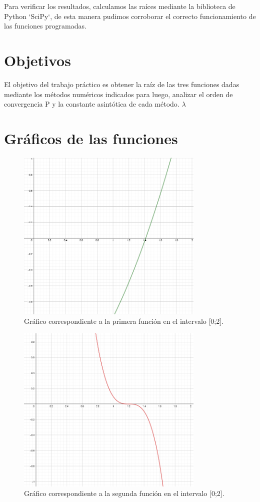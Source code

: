 \documentclass[titlepage,a4paper]{article}
\begin{document}
Para verificar los resultados, calculamos las raíces mediante la biblioteca de Python `SciPy`, de esta manera pudimos corroborar el correcto funcionamiento de las funciones programadas.

\section{Objetivos}\label{sec:objetivos}
El objetivo del trabajo práctico es obtener la raíz de las tres funciones dadas mediante los métodos numéricos indicados para luego, analizar el orden de convergencia P y la constante asintótica de cada método. $\lambda$


\section{Gráficos de las funciones}\label{sec:graficosfun}

\begin{figure}[H]
\centering
\includegraphics[width=0.8\textwidth]{funcion1.png}
\caption{\label{fig:class01}Gráfico correspondiente a la primera función en el intervalo [0;2].}
\end{figure}

\begin{figure}[H]
\centering
\includegraphics[width=0.8\textwidth]{funcion2.png}
\caption{\label{fig:class01}Gráfico correspondiente a la segunda función en el intervalo [0;2].}
\end{figure}
\end{document}
